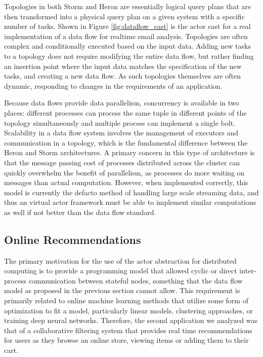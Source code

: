 \documentclass[conference,twocolumn,10pt]{IEEEtran}
\begin{document}
Topologies in both Storm and Heron are essentially logical query plans that are then transformed into a physical query plan on a given system with a specific number of tasks. Shown in Figure \ref{fig:dataflow_cast} is the actor cast for a real implementation of a data flow for realtime email analysis. Topologies are often complex and conditionally executed based on the input data. Adding new tasks to a topology does not require modifying the entire data flow, but rather finding an insertion point where the input data matches the specification of the new tasks, and creating a new data flow. As such topologies themselves are often dynamic, responding to changes in the requirements of an application.

Because data flows provide data parallelism, concurrency is available in two places: different processes can process the same tuple in different points of the topology simultaneously and multiple process can implement a single bolt. Scalability in a data flow system involves the management of executors and communication in a topology, which is the fundamental difference between the Heron and Storm architectures. A primary concern in this type of architecture is that the message passing cost of processes distributed across the cluster can quickly overwhelm the benefit of parallelism, as processes do more waiting on messages than actual computation. However, when implemented correctly, this model is currently the defacto method of handling large scale streaming data, and thus an virtual actor framework must be able to implement similar computations as well if not better than the data flow standard.

\subsection{Online Recommendations}

The primary motivation for the use of the actor abstraction for distributed computing is to provide a programming model that allowed cyclic or direct inter-process communication between stateful nodes, something that the data flow model as proposed in the previous section cannot allow. This requirement is primarily related to online machine learning methods that utilize some form of optimization to fit a model, particularly linear models, clustering approaches, or training deep neural networks. Therefore, the second application we analyzed was that of a collaborative filtering system that provides real time recommendations for users as they browse an online store, viewing items or adding them to their cart.
\end{document}
